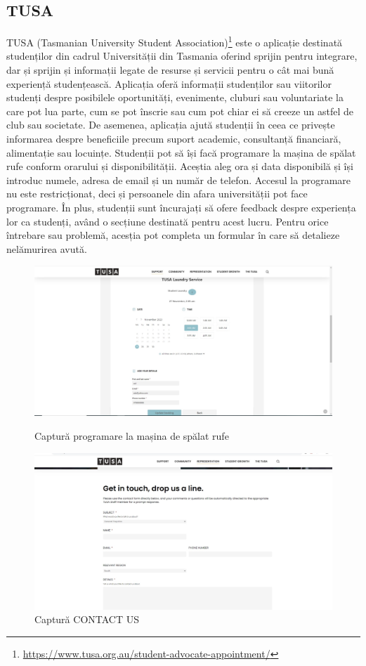 \documentclass[12pt,a4paper]{report}
\theoremstyle{definition}
\theoremstyle{remark}
\begin{document}
\subsection{TUSA }
\par TUSA (Tasmanian University Student Association)\footnote{\url{https://www.tusa.org.au/student-advocate-appointment/}}  este o aplicație destinată studenților din cadrul Universității din Tasmania oferind sprijin pentru integrare, dar și sprijin și informații legate de resurse și servicii pentru o cât mai bună experiență studențească. Aplicația oferă informații studenților sau viitorilor studenți despre posibilele oportunități, evenimente, cluburi sau voluntariate la care pot lua parte, cum se pot înscrie  sau cum pot chiar ei să creeze un astfel de club sau societate. De asemenea, aplicația ajută studenții în ceea ce privește informarea despre beneficiile precum suport academic, consultanță financiară, alimentație sau locuințe. Studenții pot să își facă programare la mașina de spălat rufe conform orarului și disponibilității. Aceștia aleg ora și data disponibilă și își introduc numele, adresa de email și un număr de telefon. Accesul la programare nu este restricționat, deci și persoanele din afara universității pot face programare.
În plus, studenții sunt încurajați să ofere feedback despre experiența lor ca studenți, având o secțiune  destinată pentru acest lucru. Pentru orice întrebare sau problemă, acesția pot completa un formular în care să  detalieze nelămurirea avută.

\begin{figure}[H]
    \centering
    \includegraphics[scale=0.26]{resurse/aplicatii_similare/tusa.png}
    \caption{Captură programare la mașina de spălat rufe}
    \vspace{15mm}
    \includegraphics[scale=0.26]{resurse/aplicatii_similare/tusa2.png}
    \caption{Captură CONTACT US}
\end{figure}
\end{document}
